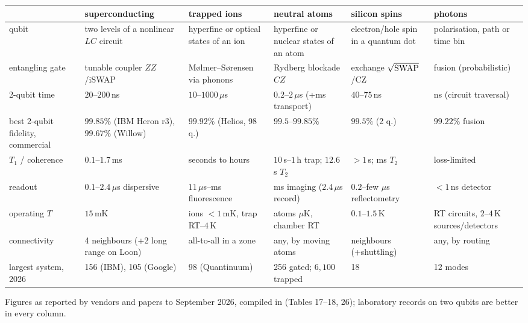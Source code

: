 \begin{center}\footnotesize
\renewcommand{\arraystretch}{1.15}
\begin{tabular}{@{}p{2.4cm}p{2.5cm}p{2.5cm}p{2.5cm}p{2.5cm}p{2.3cm}@{}}
\toprule
 & superconducting & trapped ions & neutral atoms & silicon spins & photons\\
\midrule
qubit & two levels of a nonlinear $LC$ circuit & hyperfine or optical states of an ion & hyperfine or nuclear states of an atom & electron/hole spin in a quantum dot & polarisation, path or time bin\\
entangling gate & tunable coupler $ZZ$/iSWAP & M\o lmer--S\o rensen via phonons & Rydberg blockade $CZ$ & exchange $\sqrt{\rm SWAP}$/CZ & fusion (probabilistic)\\
2-qubit time & $20$--$200$\,ns & $10$--$1000\,\mu$s & $0.2$--$2\,\mu$s (+ms transport) & $40$--$75$\,ns & ns (circuit traversal)\\
best 2-qubit fidelity, commercial & $99.85\%$ (IBM Heron r3), $99.67\%$ (Willow) & $99.92\%$ (Helios, 98 q.) & $99.5$--$99.85\%$ & $99.5\%$ (2 q.) & $99.22\%$ fusion\\
$T_1$ / coherence & $0.1$--$1.7$\,ms & seconds to hours & $10$\,s--$1$\,h trap; $12.6$\,s $T_2$ & $>1$\,s; ms $T_2$ & loss-limited\\
readout & $0.1$--$2.4\,\mu$s dispersive & $11\,\mu$s--ms fluorescence & ms imaging ($2.4\,\mu$s record) & $0.2$--few $\mu$s reflectometry & $<1$\,ns detector\\
operating $T$ & $15$\,mK & ions $<1$\,mK, trap RT--$4$\,K & atoms $\mu$K, chamber RT & $0.1$--$1.5$\,K & RT circuits, $2$--$4$\,K sources/detectors\\
connectivity & 4 neighbours (+2 long range on Loon) & all-to-all in a zone & any, by moving atoms & neighbours (+shuttling) & any, by routing\\
largest system, 2026 & 156 (IBM), 105 (Google) & 98 (Quantinuum) & 256 gated; $6,100$ trapped & 18 & 12 modes\\
\bottomrule
\end{tabular}
\end{center}
\noindent Figures as reported by vendors and papers to September 2026, compiled in
\cite{ph:uqt26} (Tables 17--18, 26); laboratory records on two qubits are better in every column.

